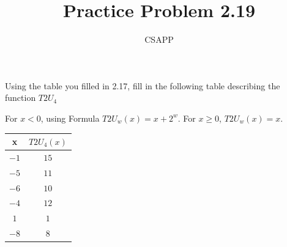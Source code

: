 \documentclass{article}
\title{Practice Problem 2.19}
\author{CSAPP}
\begin{document}
\maketitle
    \begin{center}
        Using the table you filled in 2.17, fill in
        the following table describing the function $T2U_4$

    \smallbreak
        For $x < 0$, using Formula $T2U_w(x) = x + 2^w$.
        For $x \geq 0$, $T2U_w(x) = x$.
    \smallskip

        \begin{tabular}{cc}
        \toprule
        \textbf{x} & $T2U_4(x)$ \\
            \midrule
                $-1$ & $15$ \\
                $-5$ & $11$ \\
                $-6$ & $10$ \\
                $-4$ & $12$ \\
                $1$  & $1$  \\
                $-8$ & $8$  \\
            \bottomrule
        \end{tabular}
    \end{center}
\end{document}
